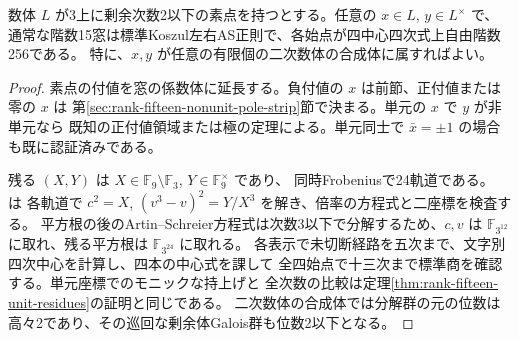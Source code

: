 \begin{theorem}\label{thm:rank-fifteen-quadratic-residue-pairs}
数体 $L$ が3上に剰余次数2以下の素点を持つとする。任意の $x\in L$, $y\in L^\times$ で、
通常な階数15窓は標準Koszul左右AS正則で、各始点が四中心四次式上自由階数256である。
特に、$x,y$ が任意の有限個の二次数体の合成体に属すればよい。
\end{theorem}
\begin{proof}
素点の付値を窓の係数体に延長する。負付値の $x$ は前節、正付値または零の $x$ は
第\ref{sec:rank-fifteen-nonunit-pole-strip}節で決まる。単元の $x$ で $y$ が非単元なら
既知の正付値領域または極の定理による。単元同士で $\bar x=\pm1$ の場合も既に認証済みである。

残る $(X,Y)$ は $X\in\mathbb F_9\setminus\mathbb F_3$, $Y\in\mathbb F_9^\times$ であり、
同時Frobeniusで24軌道である。 は
各軌道で $c^2=X$, $(v^3-v)^2=Y/X^3$ を解き、倍率の方程式と二座標を検査する。
平方根の後のArtin--Schreier方程式は次数3以下で分解するため、$c,v$ は
$\mathbb F_{3^{12}}$ に取れ、残る平方根は $\mathbb F_{3^{24}}$ に取れる。
各表示で未切断経路を五次まで、文字別四次中心を計算し、四本の中心式を課して
全四始点で十三次まで標準商を確認する。単元座標でのモニックな持上げと
全次数の比較は定理\ref{thm:rank-fifteen-unit-residues}の証明と同じである。
二次数体の合成体では分解群の元の位数は高々2であり、その巡回な剰余体Galois群も位数2以下となる。
\end{proof}
